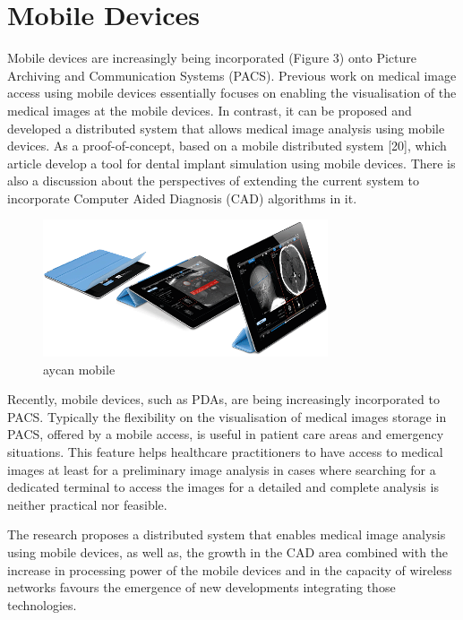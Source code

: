 \section{Mobile Devices}

Mobile devices are increasingly being incorporated (Figure 3) onto Picture Archiving and Communication Systems (PACS). Previous work on medical image access using mobile devices essentially focuses on enabling the visualisation of the medical images at the mobile devices. In contrast, it can be proposed and developed a distributed system that allows medical image analysis using mobile devices. As a proof-of-concept, based on a mobile distributed system [20], which article develop a tool for dental implant simulation using mobile devices. There is also a discussion about the perspectives of extending the current system to incorporate Computer Aided Diagnosis (CAD) algorithms in it.

\begin{figure}[!hbt]
\centering
\includegraphics[width=0.75\textwidth]{mobile.png}
\caption{\label{fig:frog}aycan mobile
}
\end{figure}

Recently, mobile devices, such as PDAs, are being increasingly incorporated to PACS. Typically the flexibility on the visualisation of medical images storage in PACS, offered by a mobile access, is useful in patient care areas and emergency situations. This feature helps healthcare practitioners to have access to medical images at least for a preliminary image analysis in cases where searching for a dedicated terminal to access the images for a detailed and complete analysis is neither practical nor feasible.

The research proposes a distributed system that enables medical image analysis using mobile devices, as well as, the growth in the CAD area combined with the increase in processing power of the mobile devices and in the capacity of wireless networks favours the emergence of new developments integrating those technologies.

